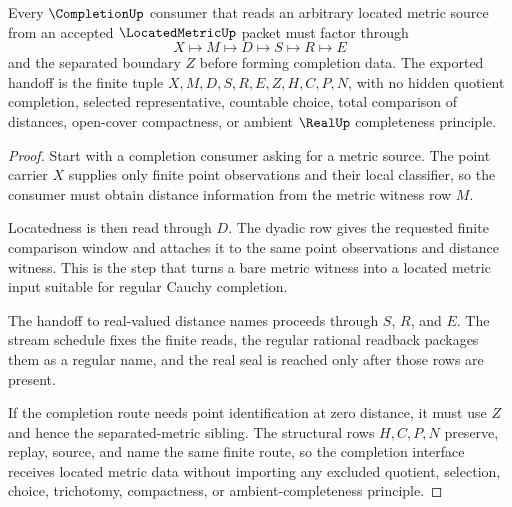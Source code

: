 \begin{theorem}
\label{thm:located-metric-completion-handoff}
Every $\CompletionUp$ consumer that reads an arbitrary located metric source from an accepted $\LocatedMetricUp$ packet must factor through
$$
X\longmapsto M\longmapsto D\longmapsto S\longmapsto R\longmapsto E
$$
and the separated boundary $Z$ before forming completion data. The exported handoff is the finite tuple $X,M,D,S,R,E,Z,H,C,P,N$, with no hidden quotient completion, selected representative, countable choice, total comparison of distances, open-cover compactness, or ambient $\RealUp$ completeness principle.
\end{theorem}
\begin{proof}
Start with a completion consumer asking for a metric source. The point carrier $X$ supplies only finite point observations and their local classifier, so the consumer must obtain distance information from the metric witness row $M$.

Locatedness is then read through $D$. The dyadic row gives the requested finite comparison window and attaches it to the same point observations and distance witness. This is the step that turns a bare metric witness into a located metric input suitable for regular Cauchy completion.

The handoff to real-valued distance names proceeds through $S$, $R$, and $E$. The stream schedule fixes the finite reads, the regular rational readback packages them as a regular name, and the real seal is reached only after those rows are present.

If the completion route needs point identification at zero distance, it must use $Z$ and hence the separated-metric sibling. The structural rows $H,C,P,N$ preserve, replay, source, and name the same finite route, so the completion interface receives located metric data without importing any excluded quotient, selection, choice, trichotomy, compactness, or ambient-completeness principle.
\end{proof}

